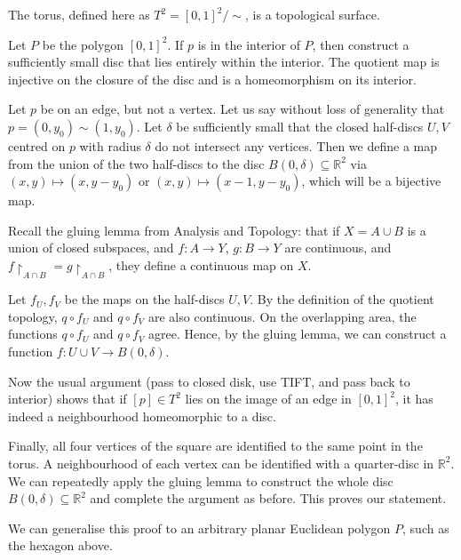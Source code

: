 \documentclass[a4paper]{article}
\begin{document}
\begin{example}
	The torus, defined here as \( T^2 = {[0,1]^2}/{\sim} \), is a topological surface.

	Let \( P \) be the polygon \( [0,1]^2 \).
	If \( p \) is in the interior of \( P \), then construct a sufficiently small disc that lies entirely within the interior.
	The quotient map is injective on the closure of the disc and is a homeomorphism on its interior.

	Let \( p \) be on an edge, but not a vertex.
	Let us say without loss of generality that \( p = (0,y_0) \sim (1,y_0) \).
	Let \( \delta \) be sufficiently small that the closed half-discs \( U, V \) centred on \( p \) with radius \( \delta \) do not intersect any vertices.
	Then we define a map from the union of the two half-discs to the disc \( B(0,\delta) \subseteq \mathbb R^2 \) via \( (x,y) \mapsto (x,y-y_0) \) or \( (x,y) \mapsto (x-1,y-y_0) \), which will be a bijective map.

	Recall the gluing lemma from Analysis and Topology: that if \( X = A \cup B \) is a union of closed subspaces, and \( f \colon A \to Y \), \( g \colon B \to Y \) are continuous, and \( f\restriction_{A \cap B} = g\restriction_{A \cap B} \), they define a continuous map on \( X \).

	Let \( f_U, f_V \) be the maps on the half-discs \( U, V \).
	By the definition of the quotient topology, \( q \circ f_U \) and \( q \circ f_V \) are also continuous.
	On the overlapping area, the functions \( q \circ f_U \) and \( q \circ f_V \) agree.
	Hence, by the gluing lemma, we can construct a function \( f \colon U \cup V \to B(0, \delta) \).

	Now the usual argument (pass to closed disk, use TIFT, and pass back to interior) shows that if \( [p] \in T^2 \) lies on the image of an edge in \( [0,1]^2 \), it has indeed a neighbourhood homeomorphic to a disc.

	Finally, all four vertices of the square are identified to the same point in the torus.
	A neighbourhood of each vertex can be identified with a quarter-disc in \( \mathbb R^2 \).
	We can repeatedly apply the gluing lemma to construct the whole disc \( B(0,\delta) \subseteq \mathbb R^2 \) and complete the argument as before. This proves our statement. 
\end{example}

We can generalise this proof to an arbitrary planar Euclidean polygon \( P \), such as the hexagon above.
\end{document}

